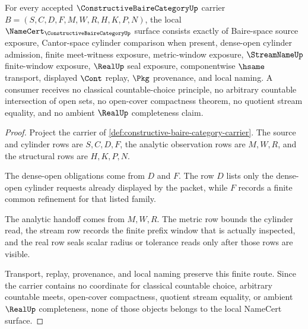 \begin{theorem}
\label{thm:constructive-baire-category-namecert-obligations}
For every accepted $\ConstructiveBaireCategoryUp$ carrier $B=(S,C,D,F,M,W,R,H,K,P,N)$, the local $\NameCert_{\ConstructiveBaireCategoryUp}$ surface consists exactly of Baire-space source exposure, Cantor-space cylinder comparison when present, dense-open cylinder admission, finite meet-witness exposure, metric-window exposure, $\StreamNameUp$ finite-window exposure, $\RealUp$ seal exposure, componentwise $\hsame$ transport, displayed $\Cont$ replay, $\Pkg$ provenance, and local naming. A consumer receives no classical countable-choice principle, no arbitrary countable intersection of open sets, no open-cover compactness theorem, no quotient stream equality, and no ambient $\RealUp$ completeness claim.
\end{theorem}
\begin{proof}
Project the carrier of \autoref{def:constructive-baire-category-carrier}. The source and cylinder rows are $S,C,D,F$, the analytic observation rows are $M,W,R$, and the structural rows are $H,K,P,N$.

The dense-open obligations come from $D$ and $F$. The row $D$ lists only the dense-open cylinder requests already displayed by the packet, while $F$ records a finite common refinement for that listed family.

The analytic handoff comes from $M,W,R$. The metric row bounds the cylinder read, the stream row records the finite prefix window that is actually inspected, and the real row seals scalar radius or tolerance reads only after those rows are visible.

Transport, replay, provenance, and local naming preserve this finite route. Since the carrier contains no coordinate for classical countable choice, arbitrary countable meets, open-cover compactness, quotient stream equality, or ambient $\RealUp$ completeness, none of those objects belongs to the local NameCert surface.
\end{proof}

